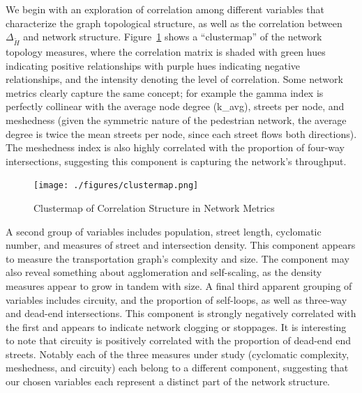 \documentclass[
  10pt,
]{article}
\begin{document}
We begin with an exploration of correlation among different variables
that characterize the graph topological structure, as well as the
correlation between \(\Delta_{\tilde{H}}\) and network structure.
Figure~\ref{fig:heatmap} shows a ``clustermap'' of the network topology
measures, where the correlation matrix is shaded with green hues
indicating positive relationships with purple hues indicating negative
relationships, and the intensity denoting the level of correlation. Some
network metrics clearly capture the same concept; for example the gamma
index is perfectly collinear with the average node degree (k\_avg),
streets per node, and meshedness (given the symmetric nature of the
pedestrian network, the average degree is twice the mean streets per
node, since each street flows both directions). The meshedness index is
also highly correlated with the proportion of four-way intersections,
suggesting this component is capturing the network's throughput.

\begin{figure}
\hypertarget{fig:heatmap}{%
\centering
\texttt{[image: ./figures/clustermap.png]}
\caption{Clustermap of Correlation Structure in Network
Metrics}\label{fig:heatmap}
}
\end{figure}

A second group of variables includes population, street length,
cyclomatic number, and measures of street and intersection density. This
component appears to measure the transportation graph's complexity and
size. The component may also reveal something about agglomeration and
self-scaling, as the density measures appear to grow in tandem with
size. A final third apparent grouping of variables includes circuity,
and the proportion of self-loops, as well as three-way and dead-end
intersections. This component is strongly negatively correlated with the
first and appears to indicate network clogging or stoppages. It is
interesting to note that circuity is positively correlated with the
proportion of dead-end end streets. Notably each of the three measures
under study (cyclomatic complexity, meshedness, and circuity) each
belong to a different component, suggesting that our chosen variables
each represent a distinct part of the network structure.
\end{document}
